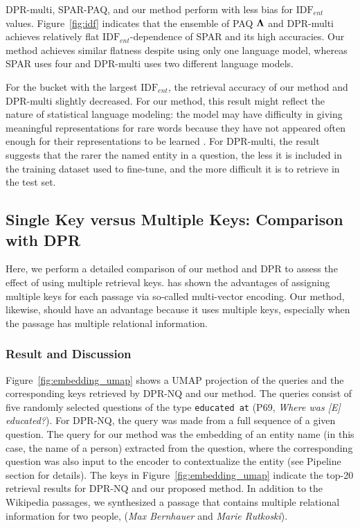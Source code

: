 \documentclass[letterpaper]{article} \usepackage{aaai23}  \usepackage{times}  \usepackage{helvet}  \usepackage{courier}  \usepackage[hyphens]{url}  \usepackage{graphicx} \urlstyle{rm} \def\UrlFont{\rm}  \usepackage{natbib}  \usepackage{caption} \frenchspacing  \setlength{\pdfpagewidth}{8.5in}  \setlength{\pdfpageheight}{11in}  \usepackage{algorithm}
\begin{document}
DPR-multi, SPAR-PAQ, and our method perform with less bias for $\mathrm{IDF}_{ent}$ values.
Figure~\ref{fig:idf} indicates that the ensemble of PAQ $\bf{\Lambda}$ and DPR-multi achieves relatively flat $\mathrm{IDF}_{ent}$-dependence of SPAR and its high accuracies.
Our method achieves similar flatness despite using only one language model, whereas SPAR uses four and DPR-multi uses two different language models.

For the bucket with the largest $\mathrm{IDF}_{ent}$, the retrieval accuracy of our method and DPR-multi slightly decreased.
For our method, this result might reflect the nature of statistical language modeling: the model may have difficulty in giving meaningful representations for rare words because they have not appeared often enough for their representations to be learned \citep[e.g.,][]{match_your_words}.
For DPR-multi, the result suggests that the rarer the named entity in a question, the less it is included in the training dataset used to fine-tune, and the more difficult it is to retrieve in the test set.


\subsection{Single Key versus Multiple Keys: Comparison with DPR}\label{sec:comparison_with_dpr}
Here, we perform a detailed comparison of our method and DPR to assess the effect of using multiple retrieval keys.
\citet{luan-etal-2021-sparse} has shown the advantages of assigning multiple keys for each passage via so-called multi-vector encoding.
Our method, likewise, should have an advantage because it uses multiple keys, especially when the passage has multiple relational information.

\subsubsection{Result and Discussion}
Figure~\ref{fig:embedding_umap} shows a UMAP projection \citep{umap} of the queries and the corresponding keys retrieved by DPR-NQ and our method.
The queries consist of five randomly selected questions of the type \texttt{\small educated at} (P69, \textit{Where was [E] educated?}).
For DPR-NQ, the query was made from a full sequence of a given question.
The query for our method was the embedding of an entity name (in this case, the name of a person) extracted from the question, where the corresponding question was also input to the encoder to contextualize the entity (see Pipeline section for details).
The keys in Figure~\ref{fig:embedding_umap} indicate the top-20 retrieval results for DPR-NQ and our proposed method.
In addition to the Wikipedia passages, we synthesized a passage that contains multiple relational information for two people, (\textit{Max Bernhauer} and \textit{Marie Rutkoski}).
\end{document}
